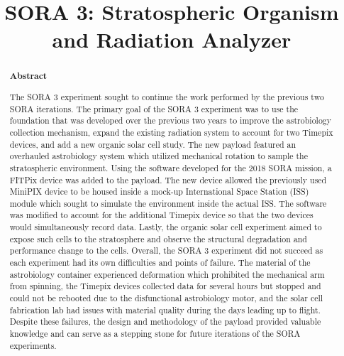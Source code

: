 \documentclass[aps,superscriptaddress,floatfix,nofootinbib,showpacs,amsmath,amssymb,altaffilletter,floatfix,onecolumn]{revtex4-1}
\begin{document}
\title{SORA 3: Stratospheric Organism and Radiation Analyzer}

\begin{abstract}
\begin{center}
{\bf Abstract}
\end{center}
\frenchspacing

The SORA 3 experiment sought to continue the work performed by the previous two SORA iterations.
The primary goal of the SORA 3 experiment was to use the foundation that was developed over the previous two years to improve the astrobiology collection mechanism, expand the existing radiation system to account for two Timepix devices, and add a new organic solar cell study. 
The new payload featured an overhauled astrobiology system which utilized mechanical rotation to sample the stratospheric environment.
Using the software developed for the 2018 SORA mission, a FITPix device was added to the payload.
The new device allowed the previously used MiniPIX device to be housed inside a mock-up International Space Station (ISS) module which sought to simulate the environment inside the actual ISS.
The software was modified to account for the additional Timepix device so that the two devices would simultaneously record data.
Lastly, the organic solar cell experiment aimed to expose such cells to the stratosphere and observe the structural degradation and performance change to the cells.
Overall, the SORA 3 experiment did not succeed as each experiment had its own difficulties and points of failure.
The material of the astrobiology container experienced deformation which prohibited the mechanical arm from spinning, the Timepix devices collected data for several hours but stopped and could not be rebooted due to the disfunctional astrobiology motor, and the solar cell fabrication lab had issues with material quality during the days leading up to flight. 
Despite these failures, the design and methodology of the payload provided valuable knowledge and can serve as a stepping stone for future iterations of the SORA experiments. 

\newpage %
\end{abstract}

\setlength{\parindent}{1em}
\setdefaultleftmargin{1em}{1em}{}{}{}{}
\setcounter{page}{0}\thispagestyle{empty}
\maketitle
\onecolumngrid
\setcounter{tocdepth}{2}
\setcounter{page}{0}\thispagestyle{empty}
\tableofcontents
\setcounter{page}{0}\thispagestyle{empty}
\newpage
\onecolumngrid
\end{document}
